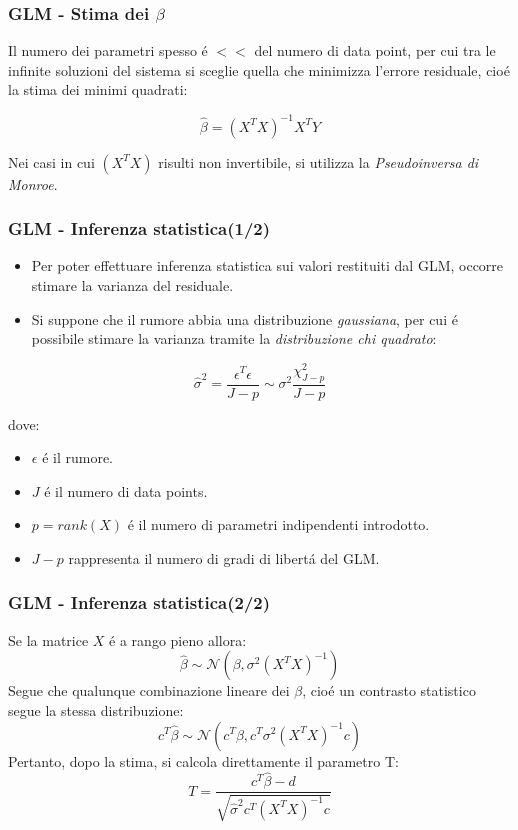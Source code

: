 \documentclass{beamer}
\begin{document}
\begin{frame}
\frametitle{GLM - Stima dei $\beta$}
Il numero dei parametri spesso \'e $<<$ del numero di data point, per cui tra le infinite soluzioni del sistema si sceglie quella che minimizza l'errore residuale, cio\'e la \alert{stima dei minimi quadrati}:

$$ 	\hat{\beta} = (X^TX)^{-1} X^TY$$

Nei casi in cui $(X^TX)$ risulti non invertibile, si utilizza la \emph{Pseudoinversa di Monroe}.
\end{frame}

\begin{frame}
\frametitle{GLM - Inferenza statistica(1/2)}

\begin{itemize}
\item Per poter effettuare inferenza statistica sui valori restituiti dal GLM, occorre stimare la \alert{varianza del residuale}.
\item Si suppone che il rumore abbia una distribuzione \emph{gaussiana}, per cui \'e possibile stimare la varianza tramite la \emph{distribuzione chi quadrato}:
\end{itemize}
 
$$\hat{\sigma}^2 = \frac{\epsilon^T\epsilon}{J - p} \sim \sigma^2 \frac{\chi^2_{J-p}}{J-p}$$

dove: 
\begin{itemize}
\item $\epsilon$ \'e il rumore.
\item $J$ \'e il numero di data points.
\item $p = rank(X) $ \'e il numero di parametri indipendenti introdotto.
\item $J-p$ rappresenta il numero di \alert{gradi di libert\'a} del GLM.
\end{itemize}
\end{frame}

\begin{frame}
\frametitle{GLM - Inferenza statistica(2/2)}
Se la matrice $X$ \'e a rango pieno allora:
$$\hat{\beta} \sim \mathcal{N}(\beta, \sigma^2(X^TX)^{-1})$$
Segue che qualunque combinazione lineare dei $\beta$, cio\'e un \alert{contrasto statistico} segue la stessa distribuzione:
$$c^T\hat{\beta} \sim \mathcal{N}(c^T\beta, c^T\sigma^2(X^TX)^{-1}c)$$
Pertanto, dopo la stima, si calcola direttamente il parametro T:
$$T = \frac{c^T\hat{\beta} - d}{\sqrt{\hat{\sigma}^2c^T(X^TX)^{-1}c}}$$
\end{frame}
\end{document}
